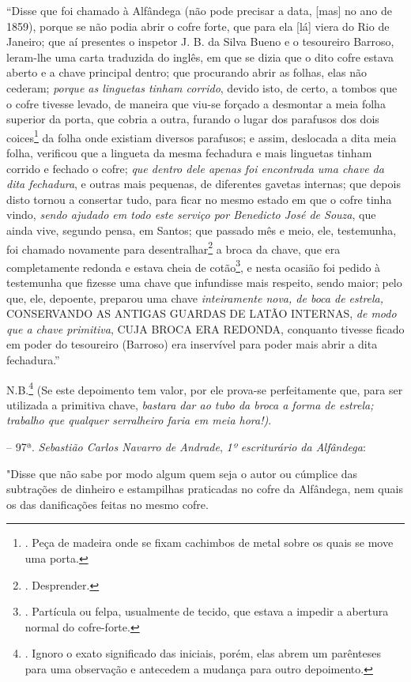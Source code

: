 ``Disse que foi chamado à Alfândega (não pode precisar a data, {[}mas{]}
no ano de 1859), porque se não podia abrir o cofre forte, que para ela
{[}lá{]} viera do Rio de Janeiro; que aí presentes o inspetor J. B. da
Silva Bueno e o tesoureiro Barroso, leram-lhe uma carta traduzida do
inglês, em que se dizia que o dito cofre estava aberto e a chave
principal dentro; que procurando abrir as folhas, elas não cederam;
\emph{porque as linguetas tinham corrido}, devido isto, de certo, a
tombos que o cofre tivesse levado, de maneira que viu-se forçado a
desmontar a meia folha superior da porta, que cobria a outra, furando o
lugar dos parafusos dos dois coices\footnote{. Peça de madeira onde se
  fixam cachimbos de metal sobre os quais se move uma porta.} da folha
onde existiam diversos parafusos; e assim, deslocada a dita meia folha,
verificou que a lingueta da mesma fechadura e mais linguetas tinham
corrido e fechado o cofre; \emph{que dentro dele apenas foi encontrada
uma chave da dita fechadura}, e outras mais pequenas, de diferentes
gavetas internas; que depois disto tornou a consertar tudo, para ficar
no mesmo estado em que o cofre tinha vindo, \emph{sendo ajudado em todo
este serviço por Benedicto José de Souza}, que ainda vive, segundo
pensa, em Santos; que passado mês e meio, ele, testemunha, foi chamado
novamente para desentralhar\footnote{. Desprender.} a broca da chave,
que era completamente redonda e estava cheia de cotão\footnote{.
  Partícula ou felpa, usualmente de tecido, que estava a impedir a
  abertura normal do cofre-forte.}, e nesta ocasião foi pedido à
testemunha que fizesse uma chave que infundisse mais respeito, sendo
maior; pelo que, ele, depoente, preparou uma chave \emph{inteiramente
nova, de boca de estrela,} CONSERVANDO AS ANTIGAS GUARDAS DE LATÃO
INTERNAS, \emph{de modo que a chave primitiva}, CUJA BROCA ERA REDONDA,
conquanto tivesse ficado em poder do tesoureiro (Barroso) era inservível
para poder mais abrir a dita fechadura.''

N.B.\footnote{. Ignoro o exato significado das iniciais, porém, elas
  abrem um parênteses para uma observação e antecedem a mudança para
  outro depoimento.} (Se este depoimento tem valor, por ele prova-se
perfeitamente que, para ser utilizada a primitiva chave, \emph{bastara
dar ao tubo da broca a forma de estrela; trabalho que qualquer
serralheiro faria em meia hora!)}.

-- 97ª. \emph{Sebastião Carlos Navarro de Andrade}, \emph{1º
escriturário da Alfândega}:

"Disse que não sabe por modo algum quem seja o autor ou cúmplice das
subtrações de dinheiro e estampilhas praticadas no cofre da Alfândega,
nem quais os das danificações feitas no mesmo cofre.


